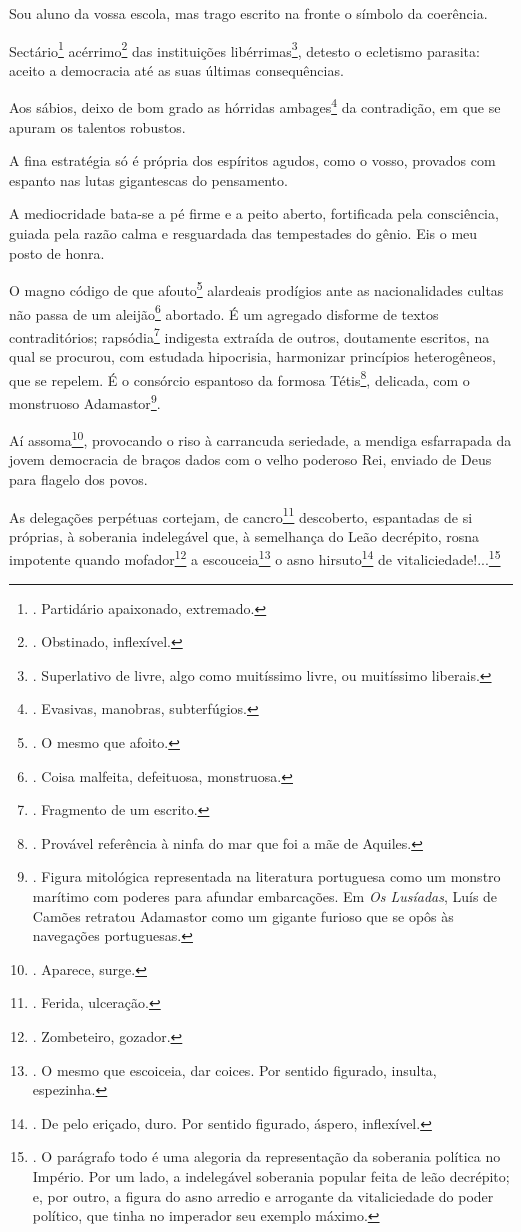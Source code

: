 Sou aluno da vossa escola, mas trago escrito na fronte o símbolo da
coerência.

Sectário\footnote{. Partidário apaixonado, extremado.}
acérrimo\footnote{. Obstinado, inflexível.} das instituições
libérrimas\footnote{. Superlativo de livre, algo como muitíssimo livre,
  ou muitíssimo liberais.}, detesto o ecletismo parasita: aceito a
democracia até as suas últimas consequências.

Aos sábios, deixo de bom grado as hórridas ambages\footnote{. Evasivas,
  manobras, subterfúgios.} da contradição, em que se apuram os talentos
robustos.

A fina estratégia só é própria dos espíritos agudos, como o vosso,
provados com espanto nas lutas gigantescas do pensamento.

A mediocridade bata-se a pé firme e a peito aberto, fortificada pela
consciência, guiada pela razão calma e resguardada das tempestades do
gênio. Eis o meu posto de honra.

O magno código de que afouto\footnote{. O mesmo que afoito.} alardeais
prodígios ante as nacionalidades cultas não passa de um
aleijão\footnote{. Coisa malfeita, defeituosa, monstruosa.} abortado. É
um agregado disforme de textos contraditórios; rapsódia\footnote{.
  Fragmento de um escrito.} indigesta extraída de outros, doutamente
escritos, na qual se procurou, com estudada hipocrisia, harmonizar
princípios heterogêneos, que se repelem. É o consórcio espantoso da
formosa Tétis\footnote{. Provável referência à ninfa do mar que foi a
  mãe de Aquiles.}, delicada, com o monstruoso Adamastor\footnote{.
  Figura mitológica representada na literatura portuguesa como um
  monstro marítimo com poderes para afundar embarcações. Em \emph{Os
  Lusíadas}, Luís de Camões retratou Adamastor como um gigante furioso
  que se opôs às navegações portuguesas.}.

Aí assoma\footnote{. Aparece, surge.}, provocando o riso à carrancuda
seriedade, a mendiga esfarrapada da jovem democracia de braços dados com
o velho poderoso Rei, enviado de Deus para flagelo dos povos.

As delegações perpétuas cortejam, de cancro\footnote{. Ferida,
  ulceração.} descoberto, espantadas de si próprias, à soberania
indelegável que, à semelhança do Leão decrépito, rosna impotente quando
mofador\footnote{. Zombeteiro, gozador.} a escouceia\footnote{. O mesmo
  que escoiceia, dar coices. Por sentido figurado, insulta, espezinha.}
o asno hirsuto\footnote{. De pelo eriçado, duro. Por sentido figurado,
  áspero, inflexível.} de vitaliciedade!...\footnote{. O parágrafo todo
  é uma alegoria da representação da soberania política no Império. Por
  um lado, a indelegável soberania popular feita de leão decrépito; e,
  por outro, a figura do asno arredio e arrogante da vitaliciedade do
  poder político, que tinha no imperador seu exemplo máximo.}

